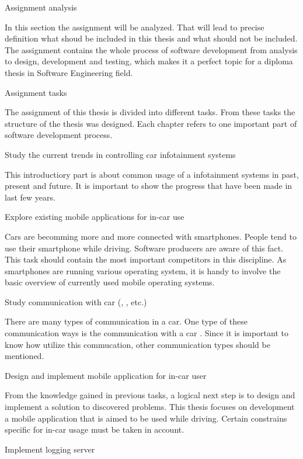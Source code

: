 

\sec Assignment analysis

In this section the assignment will be analyzed. That will lead to precise definition what shoud be included in this thesis and what should not be included. The assignment contains the whole process of software development from analysis to design, development and testing, which makes it a perfect topic for a diploma thesis in Software Engineering field.

\secc Assignment tasks

The assignment of this thesis is divided into different tasks. From these tasks the structure of the thesis was designed. Each chapter refers to one important part of software development process.

\seccc Study the current trends in controlling car infotainment systems

This introductiory part is about common usage of a infotainment systems in past, present and future. It is important to show the progress that have been made in last few years. 

\seccc Explore existing mobile applications for in-car use

Cars are becomming more and more connected with smartphones. People tend to use their smartphone while driving. Software producers are aware of this fact. This task should contain the most important competitors in this discipline. As smartphones are running various operating system, it is handy to involve the basic overview of currently used mobile operating systems.

\seccc Study communication with car  (, , etc.)

There are many types of communication in a car. One type of these communication ways is the communication with a car . Since it is important to know how utilize this commucation, other communication types should be mentioned.

\seccc Design and implement mobile application for in-car user

From the knowledge gained in previous tasks, a logical next step is to design and implement a solution to discovered problems. This thesis focuses on development a mobile application that is aimed to be used while driving. Certain constrains specific for in-car usage must be taken in account.

\seccc Implement logging server

